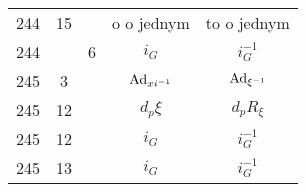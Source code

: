 \documentclass[a4paper,11pt]{article}
\begin{document}
\begin{center}
\begin{tabular}{|c|c|c|c|c|}
    244 & 15 & & o o jednym & to o jednym \\
    244 & & \hphantom{0}6 & $i_{ G }$ & $i^{ -1 }_{ G }$ \\
    245 & \hphantom{0}3 & & $\mathrm{Ad}_{ xi^{ -1 } }$ & $\mathrm{Ad}_{ \xi^{ -1 } }$ \\
    245 & 12 & & $d_{ p } \xi$ & $d_{ p } R_{ \xi }$ \\
    245 & 12 & & $i_{ G }$ & $i_{ G }^{ -1 }$ \\
    245 & 13 & & $i_{ G }$ & $i_{ G }^{ -1 }$ \\

\end{tabular}
\end{center}
\end{document}
